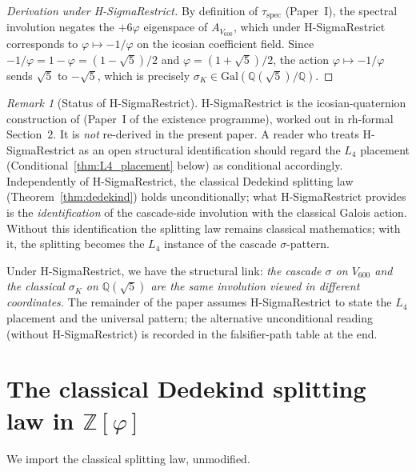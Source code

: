 \documentclass[11pt,a4paper]{article}
\theoremstyle{definition}
\theoremstyle{remark}
\newtheorem{remark}[theorem]{Remark}
\begin{document}
\begin{proof}[Derivation under H-SigmaRestrict]
By definition of $\tau_{\mathrm{spec}}$ (Paper~I), the spectral
involution negates the $+6\varphi$ eigenspace of $A_{V_{600}}$, which
under H-SigmaRestrict corresponds to $\varphi \mapsto -1/\varphi$ on
the icosian coefficient field. Since
$-1/\varphi = 1 - \varphi = (1 - \sqrt{5})/2$ and
$\varphi = (1 + \sqrt{5})/2$, the action $\varphi \mapsto -1/\varphi$
sends $\sqrt{5}$ to $-\sqrt{5}$, which is precisely
$\sigma_K \in \mathrm{Gal}(\mathbb{Q}(\sqrt{5}) / \mathbb{Q})$.
\end{proof}

\begin{remark}[Status of H-SigmaRestrict]\label{rmk:status_sigma}
H-SigmaRestrict is the icosian-quaternion construction of
\cite{SmartExistenceClosure} (Paper~I of the existence programme),
worked out in rh-formal \cite{rhFormalSmart} Section~$2$. It is
\emph{not} re-derived in the present paper. A reader who treats
H-SigmaRestrict as an open structural identification should regard the
$L_4$ placement (Conditional~\ref{thm:L4_placement} below) as
conditional accordingly. Independently of H-SigmaRestrict, the
classical Dedekind splitting law (Theorem~\ref{thm:dedekind}) holds
unconditionally; what H-SigmaRestrict provides is the
\emph{identification} of the cascade-side involution with the classical
Galois action. Without this identification the splitting law remains
classical mathematics; with it, the splitting becomes the $L_4$ instance
of the cascade $\sigma$-pattern.
\end{remark}

Under H-SigmaRestrict, we have the structural link: \emph{the cascade
$\sigma$ on $V_{600}$ and the classical $\sigma_K$ on
$\mathbb{Q}(\sqrt{5})$ are the same involution viewed in different
coordinates.} The remainder of the paper assumes H-SigmaRestrict to
state the $L_4$ placement and the universal pattern; the alternative
unconditional reading (without H-SigmaRestrict) is recorded in the
falsifier-path table at the end.

\section{The classical Dedekind splitting law in $\mathbb{Z}[\varphi]$}\label{sec:dedekind}

We import the classical splitting law, unmodified.
\end{document}
